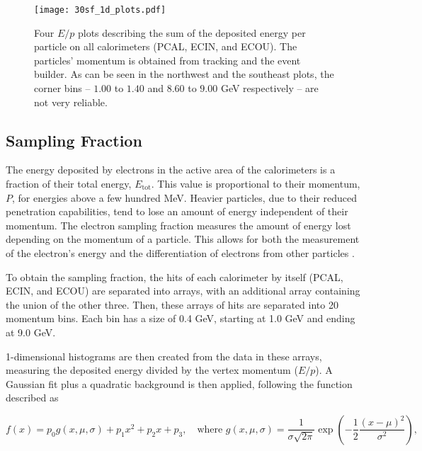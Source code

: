     \begin{figure}[b!]
        \texttt{[image: 30sf\_1d\_plots.pdf]}
        \caption[Calorimeters $E/p$ plots]
        {Four $E/p$ plots describing the sum of the deposited energy per particle on all calorimeters (PCAL, ECIN, and ECOU).
        The particles' momentum is obtained from tracking and the event builder.
        As can be seen in the northwest and the southeast plots, the corner bins -- $1.00$ to $1.40$ and $8.60$ to $9.00$ GeV respectively -- are not very reliable.}
        \label{fig::13.30::sampling_fraction_fit_1d}
    \end{figure}

\subsection{Sampling Fraction}
\label{13.30::sampling_fraction}
    The energy deposited by electrons in the active area of the calorimeters is a fraction of their total energy, $E_\text{tot}$.
    This value is proportional to their momentum, $P$, for energies above a few hundred MeV.
    Heavier particles, due to their reduced penetration capabilities, tend to lose an amount of energy independent of their momentum.
    The electron sampling fraction measures the amount of energy lost depending on the momentum of a particle.
    This allows for both the measurement of the electron's energy and the differentiation of electrons from other particles \cite{wigmans2000}.

    To obtain the sampling fraction, the hits of each calorimeter by itself (PCAL, ECIN, and ECOU) are separated into arrays, with an additional array containing the union of the other three.
    Then, these arrays of hits are separated into 20 momentum bins.
    Each bin has a size of 0.4 GeV, starting at 1.0 GeV and ending at 9.0 GeV.

    1-dimensional histograms are then created from the data in these arrays, measuring the deposited energy divided by the vertex momentum ($E/p$).
    A Gaussian fit plus a quadratic background is then applied, following the function described as

    \begin{equation*}
        f(x) = p_0 g(x, \mu, \sigma) + p_1 x^2 + p_2 x + p_3, \hspace{12pt}
        \text{where} \hspace{4pt}
        g(x, \mu, \sigma) = \frac{1}{\sigma \sqrt{2\pi}} \exp \left(-\frac{1}{2} \frac{(x - \mu)^2}{\sigma^2}\right),
    \end{equation*}

